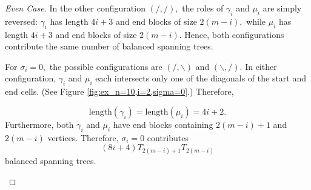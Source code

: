\documentclass{amsart}
\theoremstyle{definition}
\begin{document}
\begin{proof}[Even Case]
    In the other configuration $(/,/),$ the roles of $\gamma_i$ and $\mu_i$ are simply reversed: $\gamma_i$ has length $4i+3$ and end blocks of size $2(m-i),$ while $\mu_i$ has length $4i+3$ and end blocks of size $2(m-i).$ Hence, both configurations contribute the same number of balanced spanning trees. 
    
    For $\sigma_i=0,$ the possible configurations are $(/,\backslash)$ and $(\backslash,/).$ In either configuration, $\gamma_i$ and $\mu_i$ each intersects only one of the diagonals of the start and end cells. (See Figure \ref{fig:ex_n=10,i=2,sigma=0}.) Therefore,

    \[\text{length}(\gamma_i)=\text{length}(\mu_i)=4i+2.\]
    Furthermore, both $\gamma_i$ and $\mu_i$ have end blocks containing $2(m-i)+1$ and $2(m-i)$ vertices. Therefore, $\sigma_i=0$ contributes 
    \[(8i+4)T_{2(m-i)+1}T_{2(m-i)}\]
    balanced spanning trees.
        \begin{figure}[H]
        \centering
\end{figure}
\end{proof}
\end{document}
